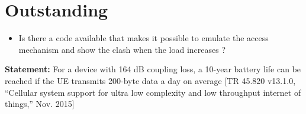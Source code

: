\documentclass[10pt,a4paper,titlepage,twoside]{article}
\newcommand{\hghlght}[1]{\textbf{\color{ymaorng} #1}}
\newcommand{\point}[1]{\textbf{\color{ymared} #1}}
\begin{document}
\clearpage
\section{\point{Outstanding}}

\begin{itemize}
\item Is there a code available that makes it possible to emulate the access mechanism and show the clash when the load increases ?

\end{itemize}

\hghlght{Statement:} For a device with 164 dB coupling loss, a 10-year battery life can be reached if the UE transmits 200-byte data a day on average {[TR 45.820 v13.1.0, “Cellular system support for ultra low complexity and low throughput internet of things,” Nov. 2015]}
\end{document}
